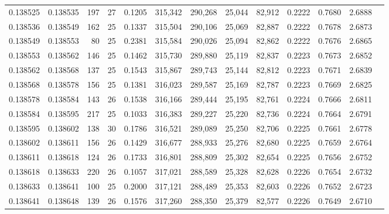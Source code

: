 \begin{tabular}{rrrrrrrrrrrrr}
0.138525 & 0.138535 &   197 &  27 &                                     0.1205 & 315,342 & 290,268 &  25,044 &  82,912 & 0.2222 & 0.7680 & 2.6888 \\
0.138536 & 0.138549 &   162 &  25 &                                     0.1337 & 315,504 & 290,106 &  25,069 &  82,887 & 0.2222 & 0.7678 & 2.6873 \\
0.138549 & 0.138553 &    80 &  25 &                                     0.2381 & 315,584 & 290,026 &  25,094 &  82,862 & 0.2222 & 0.7676 & 2.6865 \\
0.138553 & 0.138562 &   146 &  25 &                                     0.1462 & 315,730 & 289,880 &  25,119 &  82,837 & 0.2223 & 0.7673 & 2.6852 \\
0.138562 & 0.138568 &   137 &  25 &                                     0.1543 & 315,867 & 289,743 &  25,144 &  82,812 & 0.2223 & 0.7671 & 2.6839 \\
0.138568 & 0.138578 &   156 &  25 &                                     0.1381 & 316,023 & 289,587 &  25,169 &  82,787 & 0.2223 & 0.7669 & 2.6825 \\
0.138578 & 0.138584 &   143 &  26 &                                     0.1538 & 316,166 & 289,444 &  25,195 &  82,761 & 0.2224 & 0.7666 & 2.6811 \\
0.138584 & 0.138595 &   217 &  25 &                                     0.1033 & 316,383 & 289,227 &  25,220 &  82,736 & 0.2224 & 0.7664 & 2.6791 \\
0.138595 & 0.138602 &   138 &  30 &                                     0.1786 & 316,521 & 289,089 &  25,250 &  82,706 & 0.2225 & 0.7661 & 2.6778 \\
0.138602 & 0.138611 &   156 &  26 &                                     0.1429 & 316,677 & 288,933 &  25,276 &  82,680 & 0.2225 & 0.7659 & 2.6764 \\
0.138611 & 0.138618 &   124 &  26 &                                     0.1733 & 316,801 & 288,809 &  25,302 &  82,654 & 0.2225 & 0.7656 & 2.6752 \\
0.138618 & 0.138633 &   220 &  26 &                                     0.1057 & 317,021 & 288,589 &  25,328 &  82,628 & 0.2226 & 0.7654 & 2.6732 \\
0.138633 & 0.138641 &   100 &  25 &                                     0.2000 & 317,121 & 288,489 &  25,353 &  82,603 & 0.2226 & 0.7652 & 2.6723 \\
0.138641 & 0.138648 &   139 &  26 &                                     0.1576 & 317,260 & 288,350 &  25,379 &  82,577 & 0.2226 & 0.7649 & 2.6710 \\

\end{tabular}
